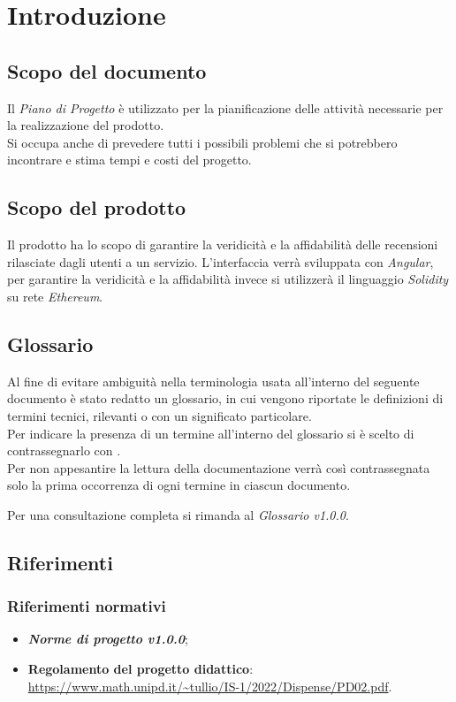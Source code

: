 \section{Introduzione}

\subsection{Scopo del documento}
Il \textit{Piano di Progetto} è utilizzato per la pianificazione delle attività necessarie per la realizzazione del prodotto. \\
Si occupa anche di prevedere tutti i possibili problemi che si potrebbero incontrare e stima tempi e costi del progetto.

\subsection{Scopo del prodotto}
Il prodotto ha lo scopo di garantire la veridicità e la affidabilità
delle recensioni rilasciate dagli utenti a un servizio. L'interfaccia verrà
sviluppata con \textit{Angular}\glo, per garantire la veridicità e la affidabilità
invece si utilizzerà il linguaggio \textit{Solidity}\glo\: su rete \textit{Ethereum}\glo.

\subsection{Glossario}
Al fine di evitare ambiguità nella terminologia usata all'interno del seguente
documento è stato redatto un glossario, in cui vengono riportate le definizioni
di termini tecnici, rilevanti o con un significato particolare. \\ Per indicare
la presenza di un termine all'interno del glossario si è scelto di
contrassegnarlo con \glo .\\ Per non appesantire la lettura della documentazione
verrà così contrassegnata solo la prima occorrenza di ogni termine in ciascun
documento.

Per una consultazione completa si rimanda al \textit{Glossario v1.0.0}.

\subsection{Riferimenti}
\subsubsection{Riferimenti normativi}
\begin{itemize}
    \item \textbf{\textit{Norme di progetto v1.0.0}};
    \item \textbf{Regolamento del progetto didattico}: \\
          \url{https://www.math.unipd.it/~tullio/IS-1/2022/Dispense/PD02.pdf}.
\end{itemize}
